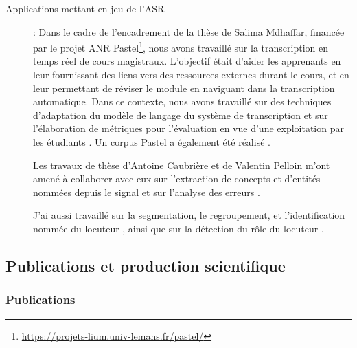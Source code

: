 \documentclass[11pt,a4paper]{article}
\begin{document}
\begin{description}
	\item[Applications mettant en jeu de l'ASR] :
	Dans le cadre de l'encadrement de la thèse de Salima Mdhaffar, financée par le projet ANR Pastel\footnote{\href{https://projets-lium.univ-lemans.fr/pastel/}{https://projets-lium.univ-lemans.fr/pastel/}}, nous avons travaillé sur la transcription en temps réel de cours magistraux. L'objectif était d'aider les apprenants en leur fournissant des liens vers des ressources externes durant le cours, et en leur permettant de réviser le module en naviguant dans la transcription automatique. Dans ce contexte, nous avons travaillé sur des techniques d'adaptation du modèle de langage du système de transcription et sur l'élaboration de métriques pour l'évaluation en vue d'une exploitation par les étudiants \cite{Mdhaffar18b,Mdhaffar19b, Mdhaffar2019}. Un corpus Pastel a également été réalisé \cite{mdhaffar2020}.
	
	Les travaux de thèse d'Antoine Caubrière et de Valentin Pelloin m'ont amené à collaborer avec eux sur l'extraction de concepts et d'entités nommées depuis le signal et sur l'analyse des erreurs \cite{Ghannay2018, Caubriere2019, caubriere2019curriculum, caubriere2020, caubriere2020b, caubriere2020int, pelloin21}.
	
	J'ai aussi travaillé sur la segmentation, le regroupement, et l'identification nommée du locuteur  \cite{Laurent12, Laurent14b, bredin21}, ainsi que sur la détection du rôle du locuteur \cite{Laurent12j1, Laurent14j1,Laurent14e}.
\end{description}





\subsection{Publications et production scientifique}

\subsubsection{Publications}
\begingroup
\setlength\bibitemsep{5pt}
\end{document}
